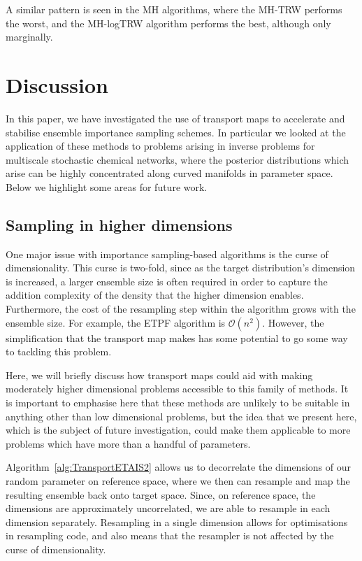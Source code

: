 \documentclass[final]{siamltex}
\begin{document}
A similar pattern is seen in the MH algorithms, where the MH-TRW
performs the worst, and the MH-logTRW algorithm performs the best,
although only marginally. 

\section{Discussion}\label{sec:conc}
In this paper, we have investigated the use of transport maps to
accelerate and stabilise ensemble importance sampling schemes. In
particular we looked at the application of these methods to problems
arising in inverse problems for multiscale stochastic chemical
networks, where the posterior distributions which arise can be highly
concentrated along curved manifolds in parameter space.
Below we highlight some areas for future work.

\subsection{Sampling in higher
  dimensions}\label{sec:TETAIS_higher_dim}

One major issue with importance sampling-based algorithms is the curse of
dimensionality. This curse is two-fold, since as the target
distribution's dimension is increased, a larger ensemble size is often
required in order to capture the addition complexity of the density
that the higher dimension enables. Furthermore, the cost of the
resampling step within the algorithm grows with the ensemble size. For
example, the ETPF algorithm is $\mathcal{O}(n^2)$. However, the
simplification that the transport map makes has some potential to go
some way to tackling this problem.

Here, we will briefly discuss how transport maps could aid
with making moderately higher dimensional problems accessible to this
family of methods. It is important to emphasise here that these
methods are unlikely to be suitable in anything other than low
dimensional problems, but the idea that we present here, which is the
subject of future investigation, could make them applicable to more
problems which have more than a handful of parameters.

Algorithm~\ref{alg:TransportETAIS2} allows us to decorrelate the
dimensions of our random parameter on reference space, where we then
can resample and map the resulting ensemble back onto target
space. Since, on reference space, the dimensions are approximately uncorrelated, we
are able to resample in each dimension separately. Resampling in a
single dimension allows for optimisations in resampling code, and also
means that the resampler is not affected by the curse of
dimensionality. 
\end{document}
